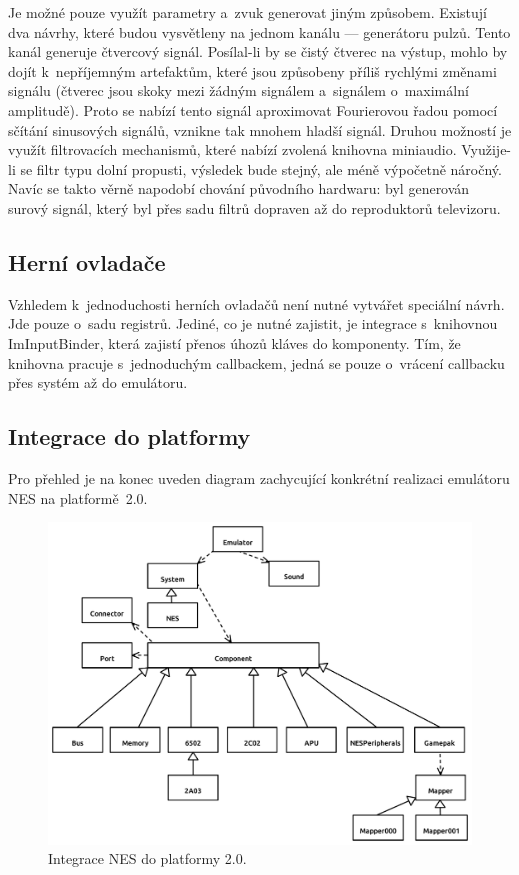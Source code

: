 Je možné pouze využít parametry a~zvuk generovat jiným způsobem. Existují dva návrhy, které budou vysvětleny na jednom kanálu --- generátoru pulzů. Tento kanál generuje čtvercový signál. Posílal-li by se čistý čtverec na výstup, mohlo by dojít k~nepříjemným artefaktům, které jsou způsobeny příliš rychlými změnami signálu (čtverec jsou skoky mezi žádným signálem a~signálem o~maximální amplitudě). Proto se nabízí tento signál aproximovat Fourierovou řadou pomocí sčítání sinusových signálů, vznikne tak mnohem hladší signál. Druhou možností je využít filtrovacích mechanismů, které nabízí zvolená knihovna miniaudio. Využije-li se filtr typu dolní propusti, výsledek bude stejný, ale méně výpočetně náročný. Navíc se takto věrně napodobí chování původního hardwaru: byl generován surový signál, který byl přes sadu filtrů dopraven až do reproduktorů televizoru.

\subsection{Herní ovladače}
Vzhledem k~jednoduchosti herních ovladačů není nutné vytvářet speciální návrh. Jde pouze o~sadu registrů. Jediné, co je nutné zajistit, je integrace s~knihovnou ImInputBinder, která zajistí přenos úhozů kláves do komponenty. Tím, že knihovna pracuje s~jednoduchým callbackem, jedná se pouze o~vrácení callbacku přes systém až do emulátoru.

\subsection{Integrace do platformy}
Pro přehled je na konec uveden diagram zachycující konkrétní realizaci emulátoru NES na platformě~2.0.

\begin{figure}[htp!]
	\centering
	\includegraphics[width=1.0\textwidth]{images/navrh_prehled.pdf}
	\caption{Integrace NES do platformy 2.0.}\label{fig:navrh-prehled}
\end{figure}


